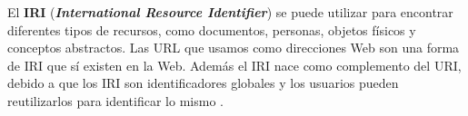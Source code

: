 El \textbf{IRI} (\textit{\textbf{International Resource Identifier}}) se puede utilizar para encontrar diferentes tipos de recursos, como documentos, personas, objetos físicos y conceptos abstractos. Las URL que usamos como direcciones Web son una forma de IRI que sí existen en la Web. Además el IRI nace como complemento del URI, debido a que los IRI son identificadores globales y los usuarios pueden reutilizarlos para identificar lo mismo \cite{libro-gis}.








